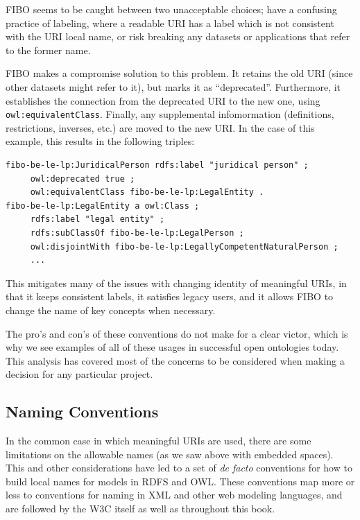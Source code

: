 FIBO seems to be caught between two unacceptable choices; have a confusing
practice of labeling, where a readable URI has a label which is not consistent
with the URI local name, or risk breaking any datasets or applications that refer to 
the former name.  

FIBO makes a compromise solution to this problem.  It retains the old URI (since 
other datasets might refer to it), but marks it as ``deprecated''.  Furthermore, it 
establishes the connection from the deprecated URI to the new one, 
using \texttt{owl:equivalentClass}.  Finally, any supplemental infomormation
(definitions, restrictions, inverses, etc.) are moved to the new URI.  In the case of 
this example, this results in the following triples: 

\begin{lstlisting}
fibo-be-le-lp:JuridicalPerson rdfs:label "juridical person" ;
     owl:deprecated true ;
     owl:equivalentClass fibo-be-le-lp:LegalEntity .
fibo-be-le-lp:LegalEntity a owl:Class ;
     rdfs:label "legal entity" ;
     rdfs:subClassOf fibo-be-le-lp:LegalPerson ;
     owl:disjointWith fibo-be-le-lp:LegallyCompetentNaturalPerson ;
     ...
\end{lstlisting}


This mitigates many of the issues with changing identity of meaningful URIs, in that 
it keeps consistent labels, it satisfies legacy users, and it allows FIBO to 
change the name of key concepts when necessary.  

The pro's and con's of these conventions do not make for a clear victor, which is 
why we see examples of all of these usages in successful open ontologies today.  
This analysis has covered most of the concerns to be considered when making a
decision for any particular project. 

\subsection{Naming Conventions}

In the common case in which meaningful URIs are used, there are some limitations
on the allowable names (as we saw above with embedded spaces).  This and other 
considerations have led to a set of \emph{de facto} conventions for how to build
local names for models in RDFS and OWL.  These conventions map more or less to conventions
for naming in XML and other web modeling languages, and are followed by the W3C
itself as well as throughout this book.

